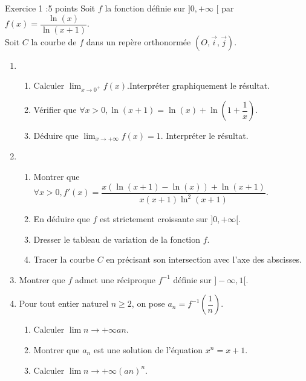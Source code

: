 \documentclass[12pt,a4paper]{article}
\begin{document}
\begin{exa}[colbacktitle=green]{Exercice 1 :5 points}
Soit $f$ la fonction définie sur $] 0,+\infty$ [ par $f(x)=\dfrac{\ln (x)}{\ln (x+1)}$.\\
Soit $ C $ la courbe de $f$ dans un repère orthonormée $(O, \vec{i}, \vec{j})$.
\begin{enumerate}
\item
\begin{enumerate}
\item Calculer $\lim _{x \to 0^{+}} f(x)$.Interpréter graphiquement le résultat.
\item Vérifier que $\forall x>0, \ln (x+1)=\ln (x)+\ln \left(1+\dfrac{1}{x}\right)$.
\item Déduire que $\lim _{x \to +\infty} f(x)=1$. Interpréter le résultat.
\end{enumerate}
\item
\begin{enumerate}
\item Montrer que $\forall x>0, f'(x)=\dfrac{x(\ln (x+1)-\ln (x))+\ln (x+1)}{x(x+1) \ln ^{2}(x+1)}$.
\item En déduire que $f$ est strictement croissante sur $] 0,+\infty[$.
\item Dresser le tableau de variation de la fonction $f$.
\item Tracer la courbe $ C $ en précisant son intersection avec l'axe des abscisses.
\end{enumerate}
\item Montrer que $f$ admet une réciproque $f^{-1}$ définie sur $] -\infty, 1[$.
\item Pour tout entier naturel $n \geq 2$, on pose $a_{n}=f^{-1}\left(\dfrac{1}{n}\right)$.
\begin{enumerate}
\item Calculer $\lim {n \to +\infty} a{n}$.
\item Montrer que $a_{n}$ est une solution de l'équation $x^{n}=x+1$.
\item Calculer $\lim {n \to +\infty}\left(a{n}\right)^{n}$.
\end{enumerate}
\end{enumerate}
\end{exa}
\end{document}
